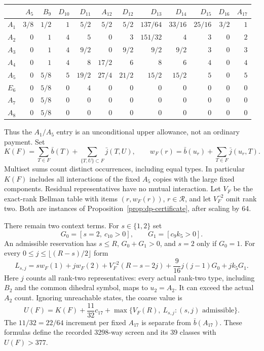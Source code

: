 \documentclass[11pt]{article}
\theoremstyle{remark}\newtheorem{remark}[theorem]{Remark}
\begin{document}
\begin{center}
\begingroup\small\setlength{\tabcolsep}{3pt}
\begin{tabular}{c*{11}{r}}
\toprule
&$A_5$&$B_9$&$D_{10}$&$D_{11}$&$A_{12}$&$D_{12}$&$D_{13}$&$D_{14}$&$D_{15}$&$D_{16}$&$A_{17}$\\
\midrule
$A_1$&$3/8$&$1/2$&$1$&$5/2$&$5/2$&$5/2$&$137/64$&$33/16$&$25/16$&$3/2$&$1$\\
$A_2$&$0$&$1$&$4$&$5$&$0$&$3$&$151/32$&$4$&$3$&$0$&$2$\\
$A_3$&$0$&$1$&$4$&$9/2$&$0$&$9/2$&$9/2$&$9/2$&$3$&$0$&$3$\\
$A_4$&$0$&$1$&$4$&$8$&$17/2$&$6$&$8$&$6$&$4$&$0$&$4$\\
$A_5$&$0$&$5/8$&$5$&$19/2$&$27/4$&$21/2$&$15/2$&$15/2$&$5$&$0$&$5$\\
$E_6$&$0$&$5/8$&$0$&$4$&$0$&$0$&$0$&$0$&$0$&$0$&$0$\\
$A_7$&$0$&$5/8$&$0$&$0$&$0$&$0$&$0$&$0$&$0$&$0$&$0$\\
$A_8$&$0$&$5/8$&$0$&$0$&$0$&$0$&$0$&$0$&$0$&$0$&$0$\\
\bottomrule
\end{tabular}
\endgroup
\end{center}
Thus the $A_1/A_5$ entry is an unconditional upper allowance, not an
ordinary payment. Set
\[
 K(F)=\sum_{T\in F}\bar b(T)
           +\sum_{\{T,U\}\subset F}\bar j(T,U),\qquad
 w_F(r)=\bar b(u_r)+\sum_{T\in F}\bar j(u_r,T).
\]
Multiset sums count distinct occurrences, including equal types. In
particular $K(F)$ includes all interactions of the fixed $A_5$ copies
with the large fixed components. Residual representatives have no mutual
interaction. Let $V_F$ be the exact-rank Bellman table with items
$(r,w_F(r))$, $r\in\mathcal R$, and let $V_F^{\neg2}$ omit rank two.
Both are instances of Proposition~\ref{prop:dp-certificate}, after scaling
by 64.

There remain two context terms. For $s\in\{1,2\}$ set
\[
 G_0=[s=2,\ c_{10}>0],\qquad G_1=[c_9k_5>0].
\]
An admissible reservation has $s\le R$, $G_0+G_1>0$, and $s=2$ only if
$G_0=1$. For every $0\le j\le\lfloor(R-s)/2\rfloor$ form
\[
 L_{s,j}=s w_F(1)+j w_F(2)+V_F^{\neg2}(R-s-2j)
                 +\frac9{16}j(j-1)G_0+jk_5G_1.
\]
Here $j$ counts all rank-two representatives: every actual rank-two
type, including $B_2$ and the common dihedral symbol, maps to $u_2=A_2$.
It can exceed the actual $A_2$ count. Ignoring unreachable states, the
coarse value is
\begin{equation}\label{eq:coarse-screen-value}
 U(F)=K(F)+\frac{11}{32}c_{17}
        +\max\bigl\{V_F(R),\ L_{s,j}: (s,j)\text{ admissible}\bigr\}.
\end{equation}
The $11/32=22/64$ increment per fixed $A_{17}$ is separate from
$\bar b(A_{17})$. These formulas define the recorded 3298-way screen
and its 39 classes with $U(F)>377$.
\end{document}
